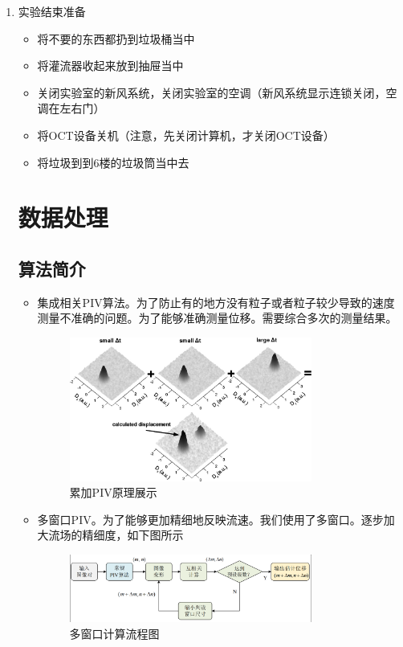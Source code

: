 \documentclass[12pt]{article}
\begin{document}
\begin{enumerate}
    \item 实验结束准备
    \begin{itemize}
        \item 将不要的东西都扔到垃圾桶当中
        \item 将灌流器收起来放到抽屉当中
        \item 关闭实验室的新风系统，关闭实验室的空调（新风系统显示连锁关闭，空调在左右门）
        \item 将OCT设备关机（注意，先关闭计算机，才关闭OCT设备）
        \item  将垃圾到到6楼的垃圾筒当中去
    \end{itemize}

    \section{数据处理}


    \subsection{算法简介}
    \begin{itemize}
    \item 集成相关PIV算法。为了防止有的地方没有粒子或者粒子较少导致的速度测量不准确的问题。为了能够准确测量位移。需要综合多次的测量结果。
    \begin{figure}
        \centering
        \includegraphics[width=0.8\textwidth]{Images/累加PIV原理展示.png}
        \caption{累加PIV原理展示}
    \end{figure}
    \item 多窗口PIV。为了能够更加精细地反映流速。我们使用了多窗口。逐步加大流场的精细度，如下图所示
    
    \begin{figure}
    \centering
    \includegraphics[width=0.8\textwidth]{Images/多窗口示意图.png}
    \caption{多窗口计算流程图}
    \end{figure}


\end{itemize}
\end{enumerate}
\end{document}
